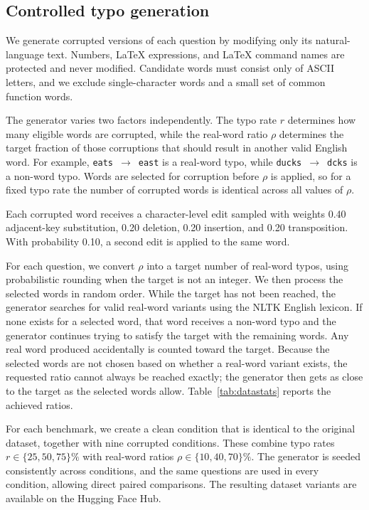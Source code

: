 \documentclass[11pt]{article}
\newcommand{\arrow}{$\rightarrow$}
\begin{document}
\subsection{Controlled typo generation}

We generate corrupted versions of each question by modifying only its
natural-language text. Numbers, \LaTeX{} expressions, and \LaTeX{} command
names are protected and never modified. Candidate words must consist only of
ASCII letters, and we exclude single-character words and a small set of common
function words.

The generator varies two factors independently. The typo rate $r$ determines
how many eligible words are corrupted, while the real-word ratio $\rho$
determines the target fraction of those corruptions that should result in
another valid English word. For example, \texttt{eats}~\arrow~\texttt{east}
is a real-word typo, while \texttt{ducks}~\arrow~\texttt{dcks} is a non-word
typo. Words are selected for corruption before $\rho$ is applied, so for a
fixed typo rate the number of corrupted words is identical across all values
of $\rho$.

Each corrupted word receives a character-level edit sampled with weights 0.40
adjacent-key substitution, 0.20 deletion, 0.20 insertion, and 0.20
transposition. With probability 0.10, a second edit is applied to the same
word.

For each question, we convert $\rho$ into a target number of real-word typos,
using probabilistic rounding when the target is not an integer. We then process
the selected words in random order. While the target has not been reached, the
generator searches for valid real-word variants using the NLTK English lexicon.
If none exists for a selected word, that word receives a non-word typo and the
generator continues trying to satisfy the target with the remaining words. Any
real word produced accidentally is counted toward the target. Because the
selected words are not chosen based on whether a real-word variant exists, the
requested ratio cannot always be reached exactly; the generator then gets as
close to the target as the selected words allow.
Table~\ref{tab:datastats} reports the achieved ratios.

For each benchmark, we create a clean condition that is identical to the
original dataset, together with nine corrupted conditions. These combine typo
rates $r \in \{25, 50, 75\}\%$ with real-word ratios
$\rho \in \{10, 40, 70\}\%$. The generator is seeded consistently across
conditions, and the same questions are used in every condition, allowing direct
paired comparisons. The resulting dataset variants are available on the Hugging
Face Hub.
\end{document}
